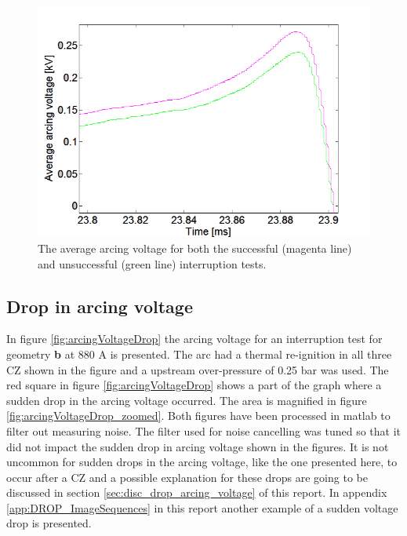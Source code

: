 \documentclass[10pt,b5paper,twoside]{article}
\begin{document}
\begin{figure}[H]
\centering
\includegraphics[scale=0.6, angle =0 ]{Bilder/Results/ArcingVoltage_18_both_average.PNG}
\caption{The average arcing voltage for both the successful (magenta line) and unsuccessful (green line) interruption tests.} \label{fig:18mm_both_ave}
\end{figure}


\newpage
\subsection{Drop in arcing voltage} \label{sec:results_drop_arcing_voltage}

In figure \ref{fig:arcingVoltageDrop} the arcing voltage for an interruption test for geometry \textbf{b} at 880 A is presented. The arc had a thermal re-ignition in all three CZ shown in the figure and a upstream over-pressure of 0.25 bar was used. The red square in figure \ref{fig:arcingVoltageDrop} shows a part of the graph where a sudden drop in the arcing voltage occurred. The area is magnified in figure \ref{fig:arcingVoltageDrop_zoomed}. Both figures have been processed in matlab to filter out measuring noise. The filter used for noise cancelling was tuned so that it did not impact the sudden drop in arcing voltage shown in the figures. It is not uncommon for sudden drops in the arcing voltage, like the one presented here, to occur after a CZ and a possible explanation for these drops are going to be discussed in section \ref{sec:disc_drop_arcing_voltage} of this report. In appendix \ref{app:DROP_ImageSequences} in this report another example of a sudden voltage drop is presented. 
\end{document}
